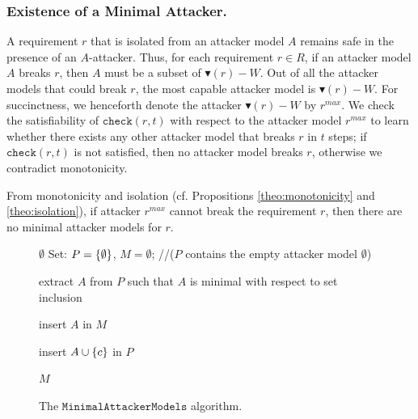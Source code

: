 \subsubsection{Existence of a Minimal Attacker.} A requirement $r$ that is isolated from an attacker model $A$ remains safe in the presence of an $A$-attacker. Thus, for each requirement $r\in R$, if an attacker model $A$ breaks $r$, then $A$ must be a subset of ${\blacktriangledown(r)-W}$. 
Out of all the attacker models that could break $r$, the most capable attacker model is $\blacktriangledown(r)-W$. For succinctness, we henceforth denote the attacker $\blacktriangledown(r)-W$ by $r^{max}$. We check the satisfiability of $\mathtt{check}(r,t)$ with respect to the attacker model $r^{max}$ to learn whether there {exists} any other attacker model that breaks $r$ in $t$ steps; if $\mathtt{check}(r,t)$ is not satisfied, then no attacker model breaks $r$, otherwise we contradict monotonicity.

\begin{corollary}
From monotonicity and isolation (cf. Propositions \ref{theo:monotonicity} and \ref{theo:isolation}), if attacker $r^{max}$ cannot break the requirement $r$, then there are no minimal attacker models for $r$. %
\end{corollary}
\begin{figure}[!h]
\centering
{
\begin{algorithm}[H]
{
	{	
		\Return $\emptyset$\;
	}
}
Set: $P=\left\{\emptyset\right\}$, $M= \emptyset$; \quad /\!/($P$ contains the empty attacker model $\emptyset$)\\
{
	extract $A$ from $P$ such that $A$ is minimal with respect to set inclusion\;
	{	
        	{
        		insert $A$ in $M$\;
        	}
        	{
        		 {
        			insert $A \cup \left\{c\right\}$ in $P$\;
        	 	}
        
        	}
	}
	
}
\Return $M$\;

 \caption{The $\mathtt{MinimalAttackerModels}$ algorithm.}
 \label{alg:CheckRequirement}
\end{algorithm}
}
\vspace{-0.5cm}
\end{figure}

